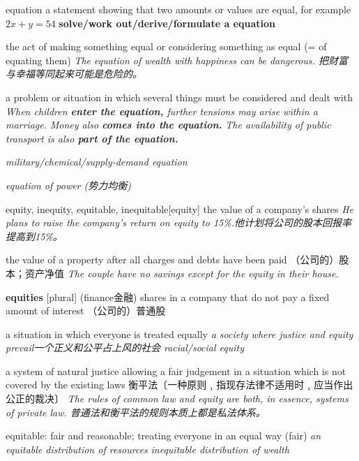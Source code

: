 \begin{DefWord}{equation}
    a statement showing that two amounts or values are equal, for example $2x + y = 54$
    \textbf{solve/work out/derive/formulate a equation}


    the act of making something equal or considering something as equal (= of equating them)
    \textit{The equation of wealth with happiness can be dangerous. 把财富与幸福等同起来可能是危险的。}

    a problem or situation in which several things must be considered and dealt with
    \textit{When children \textbf{enter the equation,} further tensions may arise within a marriage.}
    \textit{Money also \textbf{comes into the equation.}}
    \textit{The availability of public transport is also \textbf{part of the equation.}}

    \textit{military/chemical/supply-demand equation}
    
    \textit{equation of power (势力均衡)}
\end{DefWord}

\begin{DefWord}{equity, inequity, equitable, inequitable}[equity]
    the value of a company’s shares
    \textit{He plans to raise the company’s return on equity to 15\%.他计划将公司的股本回报率提高到15\%。}

    the value of a property after all charges and debts have been paid （公司的）股本；资产净值
    \textit{The couple have no savings except for the equity in their house.}

    \textbf{equities} [plural] (finance金融) shares in a company that do not pay a fixed amount of interest （公司的）普通股



    a situation in which everyone is treated equally 
    \textit{a society where justice and equity prevail一个正义和公平占上风的社会}
    \textit{racial/social equity}

    a system of natural justice allowing a fair judgement in a situation which is not covered by the existing laws 衡平法〔一种原则﹐指现存法律不适用时﹐应当作出公正的裁决〕
    \textit{The rules of common law and equity are both, in essence, systems of private law. 普通法和衡平法的规则本质上都是私法体系。}

    equitable: fair and reasonable; treating everyone in an equal way (fair)
    \textit{an equitable distribution of resources}
    \textit{inequitable distribution of wealth}
\end{DefWord}

